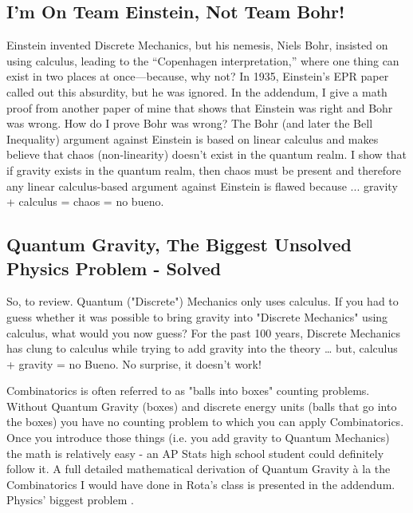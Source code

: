 \documentclass{report}
\begin{document}
\subsection*{I'm On Team Einstein, Not Team Bohr!}
Einstein invented Discrete Mechanics, but his nemesis, Niels Bohr, insisted on using calculus, leading to the “Copenhagen interpretation,” where one thing can exist in two places at once—because, why not? In 1935, Einstein’s EPR paper called out this absurdity, but he was ignored. In the addendum, I give a math proof from another paper of mine that shows that Einstein was right and Bohr was wrong. How do I prove Bohr was wrong? The Bohr (and later the Bell Inequality) argument against Einstein is based on linear calculus and makes believe that chaos (non-linearity) doesn't exist in the quantum realm. I show that if gravity exists in the quantum realm, then chaos must be present and therefore any linear calculus-based argument against Einstein is flawed because ... gravity + calculus = chaos = no bueno.

\subsection*{Quantum Gravity, The Biggest Unsolved Physics Problem - Solved \checkmark}
So, to review. Quantum ("Discrete") Mechanics only uses calculus. If you had to guess whether it was possible to bring gravity into "Discrete Mechanics" using calculus, what would you now guess? For the past 100 years, Discrete Mechanics has clung to calculus while trying to add gravity into the theory … but, calculus + gravity = no Bueno. No surprise, it doesn’t work!

Combinatorics is often referred to as "balls into boxes" counting problems. Without Quantum Gravity (boxes) and discrete energy units (balls that go into the boxes) you have no counting problem to which you can apply Combinatorics. Once you introduce those things (i.e. you add gravity to Quantum Mechanics) the math is relatively easy - an AP Stats high school student could definitely follow it. A full detailed mathematical derivation of Quantum Gravity à la the Combinatorics I would have done in Rota's class is presented in the addendum. Physics' biggest problem \checkmark.
\end{document}
